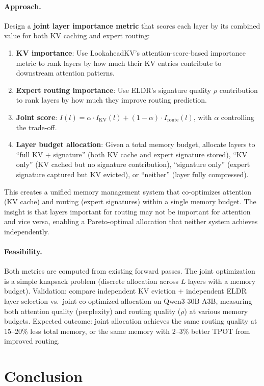 \documentclass[11pt,a4paper]{article}
\begin{document}
\paragraph{Approach.} Design a \textbf{joint layer importance metric} that scores each layer by its combined value for both KV caching and expert routing:
\begin{enumerate}
\item \textbf{KV importance}: Use LookaheadKV's attention-score-based importance metric to rank layers by how much their KV entries contribute to downstream attention patterns.
\item \textbf{Expert routing importance}: Use ELDR's signature quality $\rho$ contribution to rank layers by how much they improve routing prediction.
\item \textbf{Joint score}: $I(l) = \alpha \cdot I_{\mathrm{KV}}(l) + (1-\alpha) \cdot I_{\mathrm{route}}(l)$, with $\alpha$ controlling the trade-off.
\item \textbf{Layer budget allocation}: Given a total memory budget, allocate layers to ``full KV + signature'' (both KV cache and expert signature stored), ``KV only'' (KV cached but no signature contribution), ``signature only'' (expert signature captured but KV evicted), or ``neither'' (layer fully compressed).
\end{enumerate}
This creates a unified memory management system that co-optimizes attention (KV cache) and routing (expert signatures) within a single memory budget. The insight is that layers important for routing may not be important for attention and vice versa, enabling a Pareto-optimal allocation that neither system achieves independently.

\paragraph{Feasibility.} Both metrics are computed from existing forward passes. The joint optimization is a simple knapsack problem (discrete allocation across $L$ layers with a memory budget). Validation: compare independent KV eviction + independent ELDR layer selection vs.\ joint co-optimized allocation on Qwen3-30B-A3B, measuring both attention quality (perplexity) and routing quality ($\rho$) at various memory budgets. Expected outcome: joint allocation achieves the same routing quality at 15--20\% less total memory, or the same memory with 2--3\% better TPOT from improved routing.

\section{Conclusion}
\end{document}
